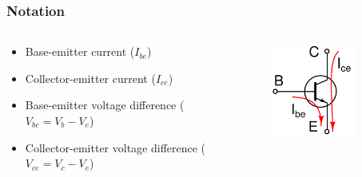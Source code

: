\documentclass[beamer]{standalone}
\begin{document}
\begin{frame}
\frametitle{Notation}
\begin{columns}[t]
	\begin{column}{.65\textwidth}
		\begin{itemize}
			\item Base-emitter current ($I_{be}$)
			\item Collector-emitter current ($I_{ce}$)
			\item Base-emitter voltage difference ($V_{be}=V_b-V_e$)
			\item Collector-emitter voltage difference ($V_{ce}=V_c-V_e$)
		\end{itemize}
	\end{column}
	\begin{column}{.35\textwidth}
		\begin{figure}
			\includegraphics[width=0.80\textwidth]{./schematics/npn_transistor_with_currents.pdf}
		\end{figure}
	\end{column}
\end{columns}
\end{frame}
\end{document}
